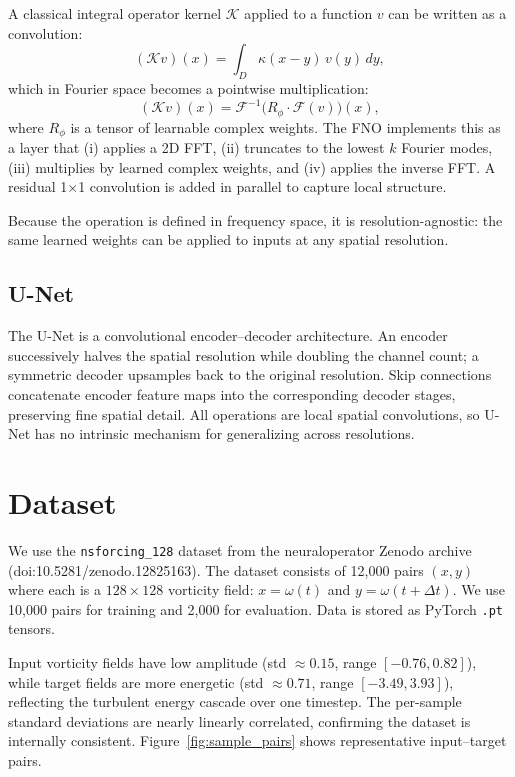\documentclass[11pt,twocolumn]{article}
\begin{document}
A classical integral operator kernel $\mathcal{K}$ applied to a function $v$ can
be written as a convolution:
\begin{equation}
  (\mathcal{K}v)(x) = \int_D \kappa(x - y)\, v(y)\,dy,
\end{equation}
which in Fourier space becomes a pointwise multiplication:
\begin{equation}
  (\mathcal{K}v)(x) = \mathcal{F}^{-1}\!\bigl(R_\phi \cdot \mathcal{F}(v)\bigr)(x),
\end{equation}
where $R_\phi$ is a tensor of learnable complex weights.
The FNO implements this as a layer that (i) applies a 2D FFT, (ii) truncates to
the lowest $k$ Fourier modes, (iii) multiplies by learned complex weights, and
(iv) applies the inverse FFT.
A residual 1$\times$1 convolution is added in parallel to capture local structure.

Because the operation is defined in frequency space, it is resolution-agnostic:
the same learned weights can be applied to inputs at any spatial resolution.

\subsection{U-Net}

The U-Net \cite{ronneberger2015unet} is a convolutional encoder--decoder
architecture.
An encoder successively halves the spatial resolution while doubling the channel
count; a symmetric decoder upsamples back to the original resolution.
Skip connections concatenate encoder feature maps into the corresponding decoder
stages, preserving fine spatial detail.
All operations are local spatial convolutions, so U-Net has no intrinsic mechanism
for generalizing across resolutions.

\section{Dataset}
\label{sec:dataset}

We use the \texttt{nsforcing\_128} dataset from the neuraloperator Zenodo
archive \cite{zenodo2024} (doi:10.5281/zenodo.12825163).
The dataset consists of 12{,}000 pairs $(x, y)$ where each is a
$128\times 128$ vorticity field: $x = \omega(t)$ and $y = \omega(t + \Delta t)$.
We use 10{,}000 pairs for training and 2{,}000 for evaluation.
Data is stored as PyTorch \texttt{.pt} tensors.

Input vorticity fields have low amplitude (std $\approx 0.15$, range $[-0.76,
0.82]$), while target fields are more energetic (std $\approx 0.71$, range
$[-3.49, 3.93]$), reflecting the turbulent energy cascade over one timestep.
The per-sample standard deviations are nearly linearly correlated, confirming
the dataset is internally consistent.
Figure~\ref{fig:sample_pairs} shows representative input--target pairs.
\end{document}
